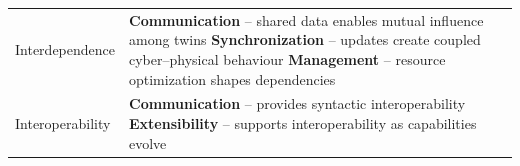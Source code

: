 \begin{table}[ht]
\begin{tabularx}{\textwidth}{p{} X}
Interdependence &
\textbf{Communication} -- shared data enables mutual influence among twins\newline
\textbf{Synchronization} -- updates create coupled cyber--physical behaviour\newline
\textbf{Management} -- resource optimization shapes dependencies
\\

Interoperability &
\textbf{Communication} -- provides syntactic interoperability\newline
\textbf{Extensibility} -- supports interoperability as capabilities evolve
\\

\hline
\end{tabularx}
\end{table}
